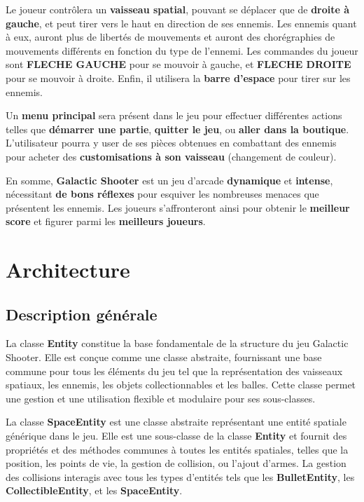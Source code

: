 \documentclass[12pt]{article}
\begin{document}
{Le joueur contrôlera un \textbf{vaisseau spatial}, pouvant se déplacer que de \textbf{droite à gauche}, et peut tirer vers le haut en direction de ses ennemis. Les ennemis quant à eux, auront plus de libertés de mouvements et auront des chorégraphies de mouvements différents en fonction du type de l'ennemi. Les commandes du joueur sont \textbf{FLECHE GAUCHE} pour se mouvoir à gauche, et \textbf{FLECHE DROITE} pour se mouvoir à droite. Enfin, il utilisera la \textbf{barre d'espace} pour tirer sur les ennemis.

Un \textbf{menu principal} sera présent dans le jeu pour effectuer différentes actions telles que \textbf{démarrer une partie}, \textbf{quitter le jeu}, ou \textbf{aller dans la boutique}. L'utilisateur pourra y user de ses pièces obtenues en combattant des ennemis pour acheter des \textbf{customisations à son vaisseau} (changement de couleur).

En somme, \textbf{Galactic Shooter} est un jeu d'arcade \textbf{dynamique} et \textbf{intense}, nécessitant \textbf{de bons réflexes} pour esquiver les nombreuses menaces que présentent les ennemis. Les joueurs s'affronteront ainsi pour obtenir le \textbf{meilleur score} et figurer parmi les \textbf{meilleurs joueurs}.


\section{Architecture}

\subsection{Description générale}

La classe \textbf{Entity} constitue la base fondamentale de la structure du jeu Galactic Shooter. Elle est conçue comme une classe abstraite, fournissant une base commune pour tous les éléments du jeu tel que la représentation des vaisseaux spatiaux, les ennemis, les objets collectionnables et les balles. Cette classe permet une gestion et une utilisation flexible et modulaire pour ses sous-classes. \newline

La classe \textbf{SpaceEntity} est une classe abstraite représentant une entité spatiale générique dans le jeu. Elle est une sous-classe de la classe \textbf{Entity} et fournit des propriétés et des méthodes communes à toutes les entités spatiales, telles que la position, les points de vie, la gestion de collision, ou l'ajout d'armes. La gestion des collisions interagis avec tous les types d'entités tels que les \textbf{BulletEntity}, les \textbf{CollectibleEntity}, et les \textbf{SpaceEntity}.\newline\newline\newline

}
\end{document}
